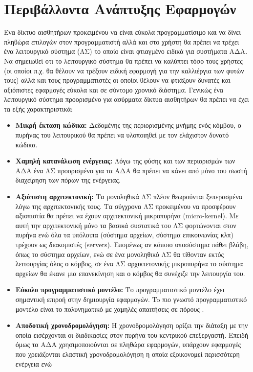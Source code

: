 \section{Περιβάλλοντα Ανάπτυξης Εφαρμογών}
Ένα δίκτυο αισθητήρων προκειμένου να είναι εύκολα προγραμματίσιμο και να δίνει πληθώρα επιλογών στον προγραμματιστή αλλά και στο χρήστη θα πρέπει να τρέχει ένα
λειτουργικό σύστημα (ΛΣ) το οποίο είναι φτιαγμένο ειδικά για συστήματα ΑΔΑ.
Να σημειωθεί οτι το λειτουργικό σύστημα θα πρέπει να καλύπτει τόσο τους χρήστες (οι οποίοι π.χ. θα θέλουν να τρέξουν ειδική εφαρμογή για την καλλιέργια των φυτών
τους) αλλά και τους προγραμματιστές οι οποίοι θέλουν να φτιάξουν δυνατές και αξιόπιστες εφαρμογές εύκολα και σε σύντομο χρονικό διάστημα.
Γενικώς ένα λειτουργικό σύστημα προορισμένο για ασύρματα δίκτυα αισθητήρων θα πρέπει να έχει τα εξής χαρακτηριστικά:
\begin{itemize}
\item \textbf{Μικρή έκταση κώδικα:} Δεδομένης της περιορισμένης μνήμης ενός κόμβου, ο πυρήνας του λειτουρικού θα πρέπει να υλοποιηθεί με τον ελάχιστον δυνατό
κώδικα.
\item \textbf{Χαμηλή κατανάλωση ενέργειας:} Λόγω της φύσης και των περιορισμών των ΑΔΑ ένα ΛΣ προορισμένο για τα ΑΔΑ θα πρέπει να κάνει από μόνο του σωστή
διαχείρηση των πόρων της ενέργειας.
\item \textbf{Αξιόπιστη αρχιτεκτονική:} Τα μονοληθικά ΛΣ πλέον θεωρούνται ξεπερασμένα λόγω της αρχιτεκτονικής τους. Τα σύγχρονα ΛΣ προκειμένου να προσφέρουν
αξιοπιστία θα πρέπει να έχουν αρχιτεκτονική μικροπυρήνα (micro-kernel).
Με αυτή την αρχιτεκτονική μόνο τα βασικά συστατικά του ΛΣ φορτώνονται στον πυρήνα ενώ όλα τα υπόλοιπα (σύστημα αρχείων, σύστημα επικοινωνίας κλπ) τρέχουν ως
διακομιστές (servers).
Επομένως αν κάποιο υποσύστημα πάθει βλάβη, όπως το σύστημα αρχείων, ενώ σε ένα μονοληθικό ΛΣ θα τίθονταν εκτός λειτουργίας όλος ο κόμβος, σε ένα ΛΣ αρχικτετονικής
μικροπυρήνα το σύστημα αρχείων θα έκανε μια επανεκίνηση και ο κόμβος θα συνέχιζε την λειτουργία του.
\item \textbf{Εύκολο προγραμματιστικό μοντέλο:} Το προγραμματιστικό μοντέλο έχει σημαντική επιροή στην δημιουργία εφαρμογών.
To πιο γνωστό προγραμματιστικό μοντέλο είναι το πολυνηματικό με χαμηλές απαιτήσεις σε πόρους \cite{os_sensors}.
\item \textbf{Αποδοτική χρονοδρομολόγηση:} Η χρονοδρομολόγηση ορίζει την διάταξη με την οποία εισέρχονται οι διαδικασίες στον πυρήνα του κεντρικού επεξεργαστή.
Επειδή όμως τα ΑΔΑ χρησιμοποιούνται σε πληθώρα εφαρμογών, υπάρχουν εφαρμογές που χρειάζονται ελαστική χρονοδρομολόγηση η οποία εξοικονομεί περισσότερη ενέργεια ενώ

\end{itemize}
